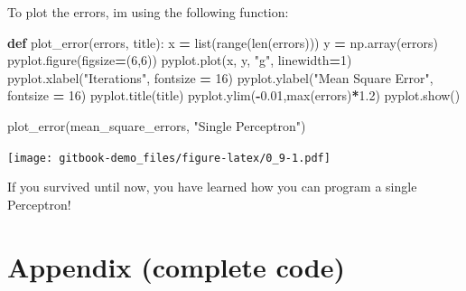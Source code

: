 \documentclass[
]{book}
\newenvironment{Shaded}{\begin{snugshade}}{\end{snugshade}}
\newcommand{\BuiltInTok}[1]{#1}
\newcommand{\DecValTok}[1]{\textcolor[rgb]{0.00,0.00,0.81}{#1}}
\newcommand{\FloatTok}[1]{\textcolor[rgb]{0.00,0.00,0.81}{#1}}
\newcommand{\KeywordTok}[1]{\textcolor[rgb]{0.13,0.29,0.53}{\textbf{#1}}}
\newcommand{\NormalTok}[1]{#1}
\newcommand{\OperatorTok}[1]{\textcolor[rgb]{0.81,0.36,0.00}{\textbf{#1}}}
\newcommand{\StringTok}[1]{\textcolor[rgb]{0.31,0.60,0.02}{#1}}
\begin{document}
To plot the errors, im using the following function:

\begin{Shaded}
\begin{Highlighting}[]
\KeywordTok{def}\NormalTok{ plot\_error(errors, title):}
\NormalTok{  x }\OperatorTok{=} \BuiltInTok{list}\NormalTok{(}\BuiltInTok{range}\NormalTok{(}\BuiltInTok{len}\NormalTok{(errors)))}
\NormalTok{  y }\OperatorTok{=}\NormalTok{ np.array(errors)}
\NormalTok{  pyplot.figure(figsize}\OperatorTok{=}\NormalTok{(}\DecValTok{6}\NormalTok{,}\DecValTok{6}\NormalTok{))}
\NormalTok{  pyplot.plot(x, y, }\StringTok{"g"}\NormalTok{, linewidth}\OperatorTok{=}\DecValTok{1}\NormalTok{)}
\NormalTok{  pyplot.xlabel(}\StringTok{"Iterations"}\NormalTok{, fontsize }\OperatorTok{=} \DecValTok{16}\NormalTok{)}
\NormalTok{  pyplot.ylabel(}\StringTok{"Mean Square Error"}\NormalTok{, fontsize }\OperatorTok{=} \DecValTok{16}\NormalTok{)}
\NormalTok{  pyplot.title(title)}
\NormalTok{  pyplot.ylim(}\OperatorTok{{-}}\FloatTok{0.01}\NormalTok{,}\BuiltInTok{max}\NormalTok{(errors)}\OperatorTok{*}\FloatTok{1.2}\NormalTok{)}
\NormalTok{  pyplot.show()}
  
  
\NormalTok{plot\_error(mean\_square\_errors, }\StringTok{"Single Perceptron"}\NormalTok{)}
\end{Highlighting}
\end{Shaded}

\texttt{[image: gitbook-demo\_files/figure-latex/0\_9-1.pdf]}

If you survived until now, you have learned how you can program a single Perceptron!

\hypertarget{appendix-complete-code}{%
\section{Appendix (complete code)}\label{appendix-complete-code}}
\end{document}
